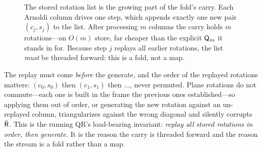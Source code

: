 \begin{figure}[t]
\centering
{}
\caption[The rotation list grows per Arnoldi column]{The stored rotation list is the
growing part of the fold's carry. Each Arnoldi column drives one
 step, which appends exactly one new pair $(c_j,s_j)$ to the
list. After processing $m$ columns the carry holds $m$ rotations---an $O(m)$ store, far
cheaper than the explicit $\mathsf{Q}_m$ it stands in for. Because step $j$ replays all
earlier rotations, the list \emph{must} be threaded forward: this is a fold, not a map.}
\label{fig:gv-growing}
\end{figure}

\begin{pitfall}
The replay must come \emph{before} the generate, and the order of the replayed
rotations matters: $(c_0,s_0)$ then $(c_1,s_1)$ then $\dots$, never permuted. Plane
rotations do not commute---each one is built in the frame the previous ones
established---so applying them out of order, or generating the new rotation against an
un-replayed column, triangularizes against the wrong diagonal and silently corrupts
$\bar{\mathsf{R}}$. This is the running QR's load-bearing invariant: \emph{replay all stored
rotations in order, then generate.} It is the reason the carry is threaded forward and
the reason the stream is a fold rather than a map.
\end{pitfall}

